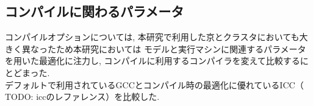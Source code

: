 \subsection{コンパイルに関わるパラメータ}
コンパイルオプションについては, 本研究で利用した京とクラスタにおいても大きく異なったため本研究においては
モデルと実行マシンに関連するパラメータを用いた最適化に注力し, コンパイルに利用するコンパイラを変えて比較するにとどまった.\\
デフォルトで利用されているGCCとコンパイル時の最適化に優れているICC（ TODO: iccのレファレンス）を比較した.
